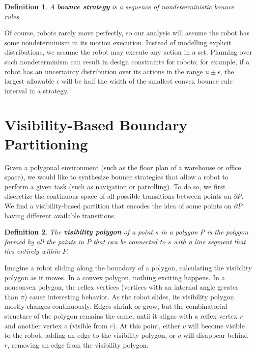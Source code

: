 \documentclass[sageh,times,Review]{sagej}
\newtheorem{definition}{Definition}
\begin{document}
\begin{definition}
A \textbf{bounce strategy} is a sequence of nondeterministic bounce rules.
\end{definition}

Of course, robots rarely move perfectly, so our analysis will assume the
robot has some nondeterminism in its motion execution.
Instead of modelling explicit
distributions, we assume the robot may execute any action in a set. 
Planning over such nondeterminism can result in design constraints
for robots; for example, if a robot has an uncertainty distribution over its 
actions in the range $u \pm \epsilon$, the largest allowable $\epsilon$ will 
be half the width of the smallest convex bounce rule interval in a strategy.

\section{Visibility-Based Boundary Partitioning} \label{secviz}

Given a polygonal environment (such as the floor plan of a warehouse or office
space), we would like to synthesize bounce strategies that allow a robot to
perform a given task (such as navigation or patrolling).
To do so, we first discretize the continuous space of all possible
transitions between points on $\partial P$. We find a visibility-based partition
that encodes the idea of some points on $\partial P$ having different
available transitions.

\begin{definition}
The \textbf{visibility polygon} of a point $s$ in a polygon $P$ is the polygon
formed by all the points in $P$ that can be connected to $s$ with a line
segment that lies entirely within $P$.
\end{definition}

Imagine a robot sliding along the boundary of a polygon, calculating 
the visibility polygon as it moves. In a convex polygon, nothing exciting 
happens. In a nonconvex polygon, the reflex vertices (vertices with an
internal angle greater than $\pi$) cause interesting
behavior.
As the robot slides, its visibility polygon mostly changes continuously. Edges
shrink or grow, but the combinatorial structure of the polygon remains the same,
until it aligns with a reflex vertex $r$ and another vertex $v$ (visible
from $r$). At this point, either 
$v$ will become visible to the robot, adding an edge to the visibility 
polygon, or $v$ will disappear behind $r$, removing an edge from the visibility polygon.
\end{document}
